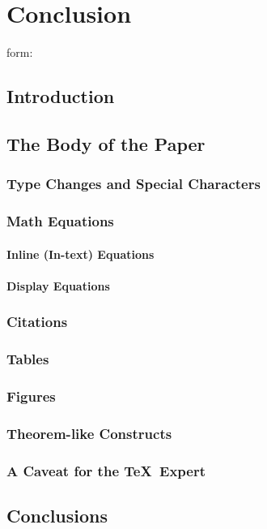 \documentclass[sigconf]{acmart}
\begin{document}
\section{Conclusion}

\appendix

form:

\subsection{Introduction}
\subsection{The Body of the Paper}
\subsubsection{Type Changes and  Special Characters}
\subsubsection{Math Equations}
\paragraph{Inline (In-text) Equations}
\paragraph{Display Equations}
\subsubsection{Citations}
\subsubsection{Tables}
\subsubsection{Figures}
\subsubsection{Theorem-like Constructs}
\subsubsection*{A Caveat for the \TeX\ Expert}
\subsection{Conclusions}
\end{document}
